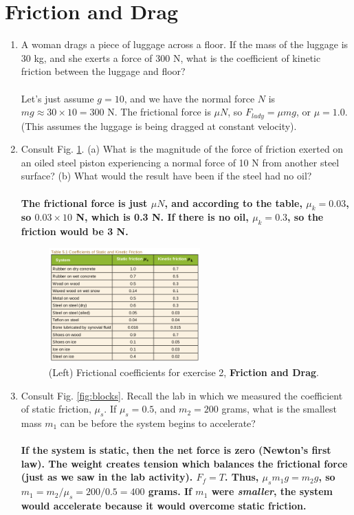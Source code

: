 \documentclass[10pt]{article}
\begin{document}
\section{Friction and Drag}
\small
\begin{enumerate}
\item A woman drags a piece of luggage across a floor.  If the mass of the luggage is 30 kg, and she exerts a force of 300 N, what is the coefficient of kinetic friction between the luggage and floor? \\ \\
Let's just assume $g=10$, and we have the normal force $N$ is $mg \approx 30\times 10 = 300$ N.  The frictional force is $\mu N$, so $F_{lady} = \mu m g$, or $\mu = 1.0$.  (This assumes the luggage is being dragged at constant velocity).
\item Consult Fig. \ref{fig:coeff}. (a) What is the magnitude of the force of friction exerted on an oiled steel piston experiencing a normal force of 10 N from another steel surface? (b) What would the result have been if the steel had no oil? \\ \\
\textbf{The frictional force is just $\mu N$, and according to the table, $\mu_k = 0.03$, so $0.03 \times 10$ N, which is 0.3 N.  If there is no oil, $\mu_k = 0.3$, so the friction would be 3 N.}
\begin{figure}
\centering
\includegraphics[width=0.55\textwidth]{figures/coefficients.png}
\caption{\label{fig:coeff} (Left) Frictional coefficients for exercise 2, \textbf{Friction and Drag}.}
\end{figure}
\item Consult Fig. \ref{fig:blocks}.  Recall the lab in which we measured the coefficient of static friction, $\mu_s$.  If $\mu_s = 0.5$, and $m_2=200$ grams, what is the smallest mass $m_1$ can be before the system begins to accelerate? \\ \\
\textbf{If the system is static, then the net force is zero (Newton's first law).  The weight creates tension which balances the frictional force (just as we saw in the lab activity). $F_f = T$.  Thus, $\mu_s m_1 g = m_2 g$, so $m_1 = m_2/\mu_s = 200/0.5 = 400$ grams.  If $m_1$ were \textit{smaller}, the system would accelerate because it would overcome static friction.}

\end{enumerate}
\end{document}
